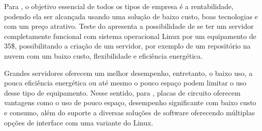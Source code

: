 Para \cite{aristotelous2016}, o objetivo essencial de todos os tipos de empresa é a rentabilidade, podendo ela ser alcançada usando uma solução de baixo custo, boas tecnologias e com um preço atrativo. Teste do \cite{aristotelous2016} apresenta a possibilidade de se ter um servidor completamente funcional com sistema operacional Linux por um equipamento de 35\$, possibilitando a criação de um servidor, por exemplo de um repositório na nuvem com um baixo custo, flexibilidade e eficiência energética. 

Grandes servidores oferecem um melhor desempenho, entretanto, o baixo uso, a pouca eficiência energética ou até mesmo o pouco espaço podem limitar o uso desse tipo de equipamento. Nesse sentido, para \cite{cusick2014}, placas de circuito oferecem vantagens como o uso de pouco espaço, desempenho significante com baixo custo e consumo, além do suporte a diversas soluções de software oferecendo múltiplas opções de interface com uma variante do Linux. 